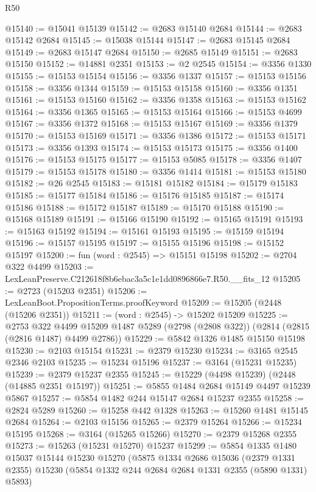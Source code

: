 \begin{lexlean}{R50}
\begin{coremodule}
@15140 := @15041 @15139
@15142 := @2683 @15140 @2684
@15144 := @2683 @15142 @2684
@15145 := @15038 @15144
@15147 := @2683 @15145 @2684
@15149 := @2683 @15147 @2684
@15150 := @2685 @15149
@15151 := @2683 @15150
@15152 := @14881 @2351
@15153 := @2 @2545
@15154 := @3356 @1330
@15155 := @15153 @15154
@15156 := @3356 @1337
@15157 := @15153 @15156
@15158 := @3356 @1344
@15159 := @15153 @15158
@15160 := @3356 @1351
@15161 := @15153 @15160
@15162 := @3356 @1358
@15163 := @15153 @15162
@15164 := @3356 @1365
@15165 := @15153 @15164
@15166 := @15153 @4699
@15167 := @3356 @1372
@15168 := @15153 @15167
@15169 := @3356 @1379
@15170 := @15153 @15169
@15171 := @3356 @1386
@15172 := @15153 @15171
@15173 := @3356 @1393
@15174 := @15153 @15173
@15175 := @3356 @1400
@15176 := @15153 @15175
@15177 := @15153 @5085
@15178 := @3356 @1407
@15179 := @15153 @15178
@15180 := @3356 @1414
@15181 := @15153 @15180
@15182 := @26 @2545
@15183 := @15181 @15182
@15184 := @15179 @15183
@15185 := @15177 @15184
@15186 := @15176 @15185
@15187 := @15174 @15186
@15188 := @15172 @15187
@15189 := @15170 @15188
@15190 := @15168 @15189
@15191 := @15166 @15190
@15192 := @15165 @15191
@15193 := @15163 @15192
@15194 := @15161 @15193
@15195 := @15159 @15194
@15196 := @15157 @15195
@15197 := @15155 @15196
@15198 := @15152 @15197
@15200 := fun (word : @2545) => @15151 @15198
@15202 := @2704 @322 @4499
@15203 := LexLeanPreserve.C212618f8b6ebac3a5c1e1dd0896866e7.R50.__fits_12
@15205 := @2723 (@15203 @2351)
@15206 := LexLeanBoot.PropositionTerms.proofKeyword
@15209 := @15205 (@2448 (@15206 @2351))
@15211 := (word : @2545) -> @15202 @15209
@15225 := @2753
    @322
    @4499
    @15209
    @1487
    @5289
    (@2798 (@2808 @322))
    (@2814 (@2815 (@2816 @1487) @4499 @2786))
@15229 := @5842 @1326 @1485 @15150 @15198
@15230 := @2103 @15154
@15231 := @2379 @15230
@15234 := @3165 @2545 @2346 @2103
@15235 := @15234 @15196
@15237 := @3164 (@15231 @15235)
@15239 := @2379 @15237 @2355
@15245 := @15229 (@4498 @15239) (@2448 (@14885 @2351 @15197))
@15251 := @5855 @1484 @2684 @15149 @4497 @15239 @5867
@15257 := @5854 @1482 @244 @15147 @2684 @15237 @2355
@15258 := @2824 @5289
@15260 := @15258 @442 @1328
@15263 := @15260 @1481 @15145 @2684
@15264 := @2103 @15156
@15265 := @2379 @15264
@15266 := @15234 @15195
@15268 := @3164 (@15265 @15266)
@15270 := @2379 @15268 @2355
@15273 := @15263 (@15231 @15270) @15237
@15299 := @5854
    @1335
    @1480
    @15037
    @15144
    @15230
    @15270
    (@5875
      @1334
      @2686
      @15036
      (@2379 @1331 @2355)
      @15230
      (@5854 @1332 @244 @2684 @2684 @1331 @2355 (@5890 @1331) @5893)

\end{coremodule}
\end{lexlean}

